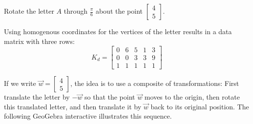 \documentclass{ximera}
\begin{document}
\begin{example}\label{exa:013322}
Rotate the letter $A$ through $\frac{\pi}{6}$ about the point $\left[
\begin{array}{c}
4\\
5
\end{array}
\right]$.

\begin{center}
\end{center} 

\begin{explanation}
Using homogenous coordinates for the vertices of the letter results in a data matrix with three rows:
\begin{equation*}
K_{d} =  \left[
\begin{array}{rrrrr}
0 & 6 & 5 & 1 & 3\\
0 & 0 & 3 & 3 & 9 \\
1 & 1 & 1 & 1 & 1
\end{array}
\right]
\end{equation*}

%


If we write $\vec{w} = \left[
\begin{array}{c}
4\\
5
\end{array}
\right]$, the idea is to use a composite of transformations: First translate the letter by $-\vec{w}$ so that the point $\vec{w}$ moves to the origin, then rotate this translated letter, and then translate it by $\vec{w}$ back to its original position. The following GeoGebra interactive illustrates this sequence.


\end{explanation}
\end{example}
\end{document}

